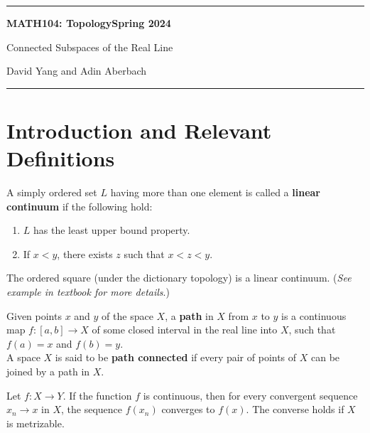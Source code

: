 \documentclass[11pt]{article}
\begin{document}
	\hrule
	\begin{center}
        \textbf{MATH104: Topology}\hfill \textbf{Spring 2024}\newline

		{\Large Connected Subspaces of the Real Line}

		David Yang and Adin Aberbach
	\end{center}

\hrule

\vspace{1em}

\section{Introduction and Relevant Definitions}

\begin{definition*}
A simply ordered set $L$ having more than one element is called a
\textbf{linear continuum} if the following hold:
\begin{enumerate}
    \item $L$ has the least upper bound property.
    \item If $x < y$, there exists $z$ such that $x < z < y$.
\end{enumerate}
\end{definition*}

\begin{eg}[1, page 155]
The ordered square (under the dictionary topology) is a linear continuum. (\textit{See example in textbook for more details}.)
\end{eg}

\begin{definition*}
Given points $x$ and $y$ of the space $X$, a \textbf{path} in $X$ from $x$ to $y$
is a continuous map $f\colon [a, b] \rightarrow X$ of some closed interval in the real line into $X$, such
that $f(a) = x$ and $f(b) = y$. \\

\noindent A space $X$ is said to be \textbf{path connected} if every pair of points of $X$ can be joined by a path in $X$.
\end{definition*}

\begin{theorem*}[21.3, page 130]
Let $f\colon X\rightarrow Y$. If the function $f$ is continuous, then for every convergent sequence $x_n \rightarrow x$ in $X$, the sequence $f(x_n)$ converges to $f(x)$. 
The converse holds if $X$ is metrizable.
\end{theorem*}
\end{document}
